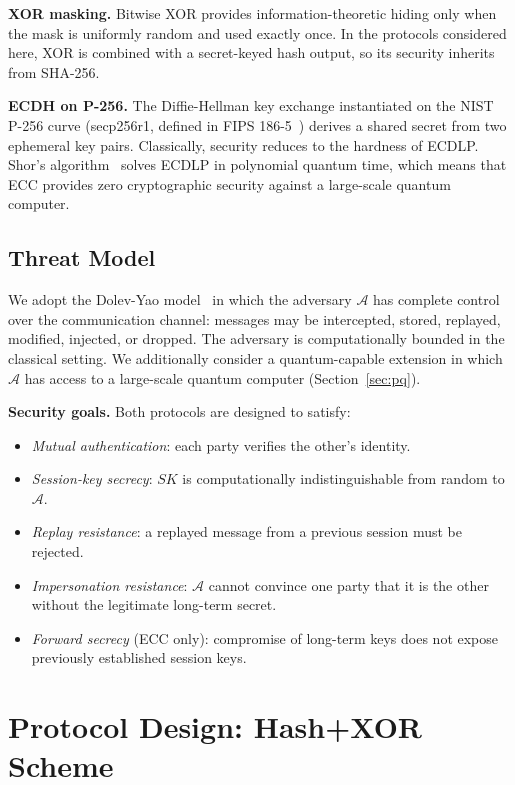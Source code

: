 \documentclass[journal]{IEEEtran}
\newcommand{\SK}{\mathit{SK}}          %
\newcommand{\adv}{\mathcal{A}}         %
\begin{document}
\textbf{XOR masking.} Bitwise XOR provides information-theoretic hiding only
when the mask is uniformly random and used exactly once. In the protocols
considered here, XOR is combined with a secret-keyed hash output, so its
security inherits from SHA-256.

\textbf{ECDH on P-256.} The Diffie-Hellman key exchange instantiated on the
NIST P-256 curve (secp256r1, defined in FIPS 186-5~\cite{NISTFIPS1865})
derives a shared secret from two ephemeral key pairs. Classically, security
reduces to the hardness of ECDLP. Shor's algorithm~\cite{Shor1997} solves
ECDLP in polynomial quantum time, which means that ECC provides zero
cryptographic security against a large-scale quantum computer.

\subsection{Threat Model}

We adopt the Dolev-Yao model~\cite{DolevYao1983} in which the adversary
$\adv$ has complete control over the communication channel: messages may be
intercepted, stored, replayed, modified, injected, or dropped. The adversary
is computationally bounded in the classical setting. We additionally consider
a quantum-capable extension in which $\adv$ has access to a large-scale
quantum computer (Section~\ref{sec:pq}).

\textbf{Security goals.} Both protocols are designed to satisfy:
\begin{itemize}
  \item \emph{Mutual authentication}: each party verifies the other's identity.
  \item \emph{Session-key secrecy}: $\SK$ is computationally indistinguishable
    from random to $\adv$.
  \item \emph{Replay resistance}: a replayed message from a previous session
    must be rejected.
  \item \emph{Impersonation resistance}: $\adv$ cannot convince one party that
    it is the other without the legitimate long-term secret.
  \item \emph{Forward secrecy} (ECC only): compromise of long-term keys does
    not expose previously established session keys.
\end{itemize}

\section{Protocol Design: Hash+XOR Scheme}
\label{sec:hash}
\end{document}
